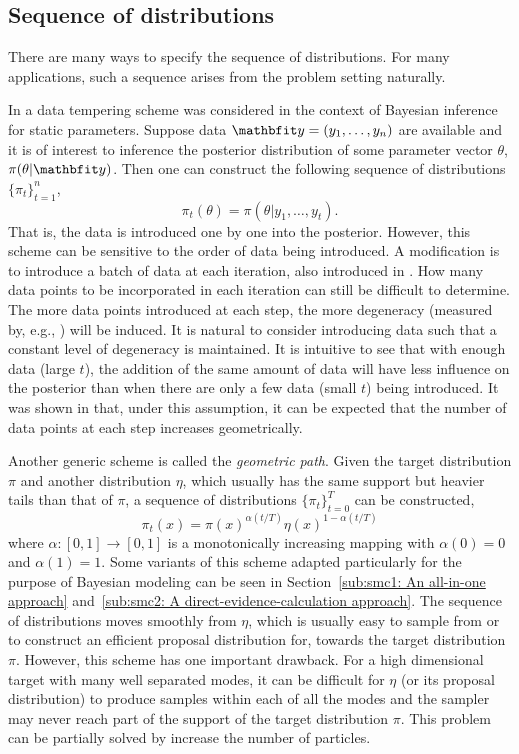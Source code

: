 \subsection{Sequence of distributions}
\label{sub:Sequence of distributions}

There are many ways to specify the sequence of distributions. For many
applications, such a sequence arises from the problem setting naturally.

In \cite{Chopin:2002hg} a data tempering scheme was considered in the context
of Bayesian inference for static parameters. Suppose data $\data =
(y_1,\dots,y_n)$ are available and it is of interest to inference the
posterior distribution of some parameter vector $\theta$, $\pi(\theta|\data)$.
Then one can construct the following sequence of distributions
$\{\pi_t\}_{t=1}^n$,
\begin{equation}
  \pi_t(\theta) = \pi(\theta|y_1,\dots,y_t).
\end{equation}
That is, the data is introduced one by one into the posterior. However, this
scheme can be sensitive to the order of data being introduced. A modification
is to introduce a batch of data at each iteration, also introduced in
\cite{Chopin:2002hg}. How many data points to be incorporated in each
iteration can still be difficult to determine. The more data points introduced
at each step, the more degeneracy (measured by, e.g., \ess) will be induced.
It is natural to consider introducing data such that a constant level of
degeneracy is maintained. It is intuitive to see that with enough data (large
$t$), the addition of the same amount of data will have less influence on the
posterior than when there are only a few data (small $t$) being introduced.
It was shown in \cite{Chopin:2002hg} that, under this assumption, it can be
expected that the number of data points at each step increases geometrically.

Another generic scheme is called the \emph{geometric path}. Given the target
distribution $\pi$ and another distribution $\eta$, which usually has the same
support but heavier tails than that of $\pi$, a sequence of distributions
$\{\pi_t\}_{t=0}^T$ can be constructed,
\begin{equation}
  \pi_t(x) = \pi(x)^{\alpha(t/T)}\eta(x)^{1-\alpha(t/T)}
\end{equation}
where $\alpha:[0,1]\to[0,1]$ is a monotonically increasing mapping with
$\alpha(0) = 0$ and $\alpha(1) = 1$. Some variants of this scheme adapted
particularly for the purpose of Bayesian modeling can be seen in
Section~\ref{sub:smc1: An all-in-one approach} and~\ref{sub:smc2: A
  direct-evidence-calculation approach}. The sequence of distributions moves
smoothly from $\eta$, which is usually easy to sample from or to construct an
efficient proposal distribution for, towards the target distribution $\pi$.
However, this scheme has one important drawback. For a high dimensional target
with many well separated modes, it can be difficult for $\eta$ (or its
proposal distribution) to produce samples within each of all the modes and the
sampler may never reach part of the support of the target distribution $\pi$.
This problem can be partially solved by increase the number of particles.

